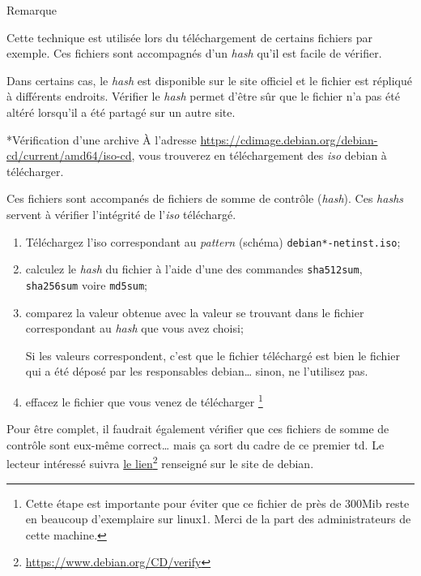 \documentclass[a4paper,11pt]{article}
\let\oldhref\href
\renewcommand{\href}[2]{\oldhref{#1}{#2}\footnote{\url{#1}}}
\begin{document}
\bigskip
\bigskip
\begin{coltbox}{Remarque}	

	Cette technique est utilisée lors du téléchargement de certains fichiers par
	exemple. Ces fichiers sont accompagnés d'un \textit{hash} qu'il est facile
	de vérifier. 

	Dans certains cas, le \textit{hash} est disponible sur le site officiel et
	le fichier est répliqué à différents endroits. Vérifier le \textit{hash}
	permet d'être sûr que le fichier n'a pas été altéré lorsqu'il a été partagé
	sur un autre site.  

\end{coltbox}

\clearpage
\begin{Exercice}*{Vérification d'une archive}
	À l'adresse \url{https://cdimage.debian.org/debian-cd/current/amd64/iso-cd},
	vous trouverez en téléchargement des \textit{iso} debian à télécharger. 
	
	Ces fichiers sont accompanés de fichiers de somme de contrôle
	(\textit{hash}).  Ces \textit{hashs} servent à vérifier l'intégrité de
	l'\textit{iso} téléchargé.

	\begin{enumerate}

		\item Téléchargez l'iso correspondant au \textit{pattern} (schéma)
			\texttt{debian*-netinst.iso};

		\item calculez le \textit{hash} du fichier à l'aide d'une des commandes
			\texttt{sha512sum}, \texttt{sha256sum} voire \texttt{md5sum};

		\item comparez la valeur obtenue avec la valeur se trouvant dans le
			fichier correspondant au \textit{hash} que vous avez choisi;

			\medskip
			Si les valeurs correspondent, c'est que le fichier téléchargé est
			bien le fichier qui a été déposé par les responsables debian… sinon,
			ne l'utilisez pas. 
			\medskip

		\item effacez le fichier que vous venez de télécharger \footnote{Cette
			étape est importante pour éviter que ce fichier de près de 300Mib
			reste en beaucoup d'exemplaire sur linux1. Merci de la part des
			administrateurs de cette machine.}

	\end{enumerate}

	Pour être complet, il faudrait également vérifier que ces fichiers de somme
	de contrôle sont eux-même correct… mais ça sort du cadre de ce premier td.
	Le lecteur intéressé suivra \href{https://www.debian.org/CD/verify}{le lien}
	renseigné sur le site de debian. 
	
\end{Exercice}
\end{document}
